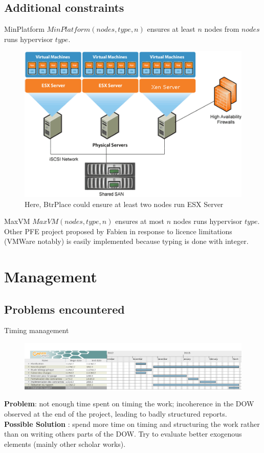\documentclass{beamer}
\begin{document}
\subsection{Additional constraints}
\begin{frame}{MinPlatform}
$MinPlatform(nodes, type, n)$ ensures at least $n$ nodes from $nodes$ runs
hypervisor $type$.
\begin{figure}[!ht]
	\centering
	\includegraphics[scale=.4]{imgs/samplecloud.png}
	\caption{Here, BtrPlace could ensure at least two nodes run ESX Server}
\end{figure}
\end{frame}
\begin{frame}{MaxVM}
$MaxVM(nodes, type, n)$ ensures at most $n$ nodes runs hypervisor $type$.\\
\pause Other PFE project proposed by Fabien in response to licence limitations
(VMWare notably) is easily implemented because typing is done with integer.
\end{frame}

\section{Management}
\subsection{Problems encountered}
\begin{frame}{Timing management}
\begin{figure}[!ht]
	\includegraphics[scale=.2]{imgs/gantt2.png}
\end{figure}
\textbf{Problem}: not enough time spent on timing the work; incoherence
in the DOW observed at the end of the project, leading to badly structured
reports.\\
\pause\textbf{Possible Solution} : spend more time on timing and structuring the
work rather than on writing others parts of the DOW. Try to evaluate better
exogenous elements (mainly other scholar works).
\end{frame}
\end{document}
